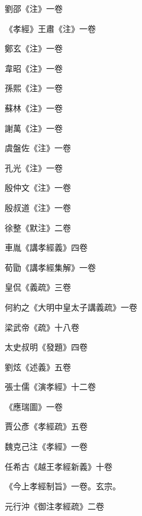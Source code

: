 \begin{pinyinscope}
 劉邵《注》一卷



 《孝經》王肅《注》一卷



 鄭玄《注》一卷



 韋昭《注》一卷



 孫熙《注》一卷



 蘇林《注》一卷



 謝萬《注》一卷



 虞盤佐《注》一卷



 孔光《注》一卷



 殷仲文《注》一卷



 殷叔道《注》一卷



 徐整《默注》二卷



 車胤《講孝經義》四卷



 荀勖《講孝經集解》一卷



 皇侃《義疏》三卷



 何約之《大明中皇太子講義疏》一卷



 梁武帝《疏》十八卷



 太史叔明《發題》四卷



 劉炫《述義》五卷



 張士儒《演孝經》十二卷



 《應瑞圖》一卷



 賈公彥《孝經疏》五卷



 魏克己注《孝經》一卷



 任希古《越王孝經新義》十卷



 《今上孝經制旨》一卷。玄宗。



 元行沖《御注孝經疏》二卷




\end{pinyinscope}
